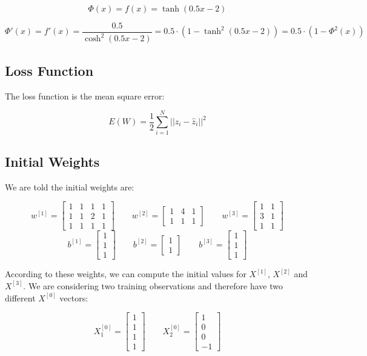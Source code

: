 \documentclass{article}
\begin{document}
\[ \Phi(x) = f(x) = \tanh(0.5x-2) \]

\[ \Phi'(x) = f'(x) = \frac{0.5}{\cosh^2(0.5x-2)} =0.5 \cdot \left( 1 - \tanh^2(0.5x-2) \right) = 0.5 \cdot \left( 1 - \Phi^2(x) \right) \]

\subsection*{Loss Function}

The loss function is the mean square error:

\[ E(W) = \frac{1}{2} \sum_{i=1}^{N} ||z_i - \hat{z}_i||^2 \]

\subsection*{Initial Weights}

We are told the initial weights are:

\[ w^{[1]} = \begin{bmatrix} 1 & 1 & 1 & 1 \\ 1 & 1 & 2 & 1 \\ 1 & 1 & 1 & 1 \end{bmatrix} \qquad w^{[2]} = \begin{bmatrix} 1 & 4 & 1 \\ 1 & 1 & 1 \end{bmatrix} \qquad w^{[3]} = \begin{bmatrix} 1 & 1  \\ 3 & 1 \\ 1 & 1 \end{bmatrix} \]
\[ b^{[1]} = \begin{bmatrix} 1 \\ 1 \\ 1 \end{bmatrix} \qquad b^{[2]} = \begin{bmatrix} 1 \\ 1 \end{bmatrix} \qquad b^{[3]} = \begin{bmatrix} 1 \\ 1 \\ 1 \end{bmatrix} \]

According to these weights, we can compute the initial values for $X^{[1]}$, $X^{[2]}$ and $X^{[3]}$. 
We are considering two training observations and therefore have two different $X^{[0]}$ vectors:

\[ X^{[0]}_1 = \begin{bmatrix} 1 \\ 1 \\ 1 \\ 1  \end{bmatrix} \qquad X^{[0]}_2 = \begin{bmatrix} 1 \\ 0 \\ 0 \\ -1  \end{bmatrix} \]
\end{document}
